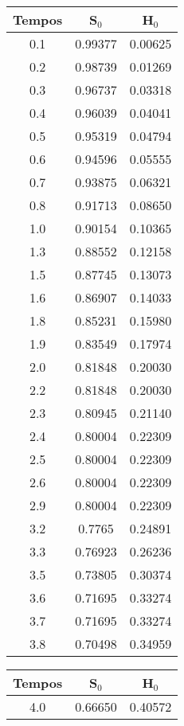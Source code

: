 \documentclass[12pt,a4paper]{article}
\begin{document}
 	\begin{center}
 		\begin{tabular}{|c|c|c|}\hline
 			Tempos & S$_{0}$ & H$_{0}$\\ \hline
 			0.1 & 0.99377 & 0.00625\\ \hline
 			0.2 & 0.98739 & 0.01269\\ \hline
 			0.3 & 0.96737 & 0.03318\\ \hline
 			0.4 & 0.96039 & 0.04041\\ \hline
 			0.5 & 0.95319 & 0.04794\\ \hline
 			0.6 & 0.94596 & 0.05555\\ \hline
 			0.7 & 0.93875 & 0.06321\\ \hline
 			0.8 & 0.91713 & 0.08650\\ \hline
 			1.0 & 0.90154 & 0.10365\\ \hline
 			1.3 & 0.88552 & 0.12158\\ \hline
 			1.5 & 0.87745 & 0.13073\\ \hline
 			1.6 & 0.86907 & 0.14033\\ \hline
 			1.8 & 0.85231 & 0.15980\\ \hline
 			1.9 & 0.83549 & 0.17974\\ \hline
 			2.0 & 0.81848 & 0.20030\\ \hline
 			2.2 & 0.81848 & 0.20030\\ \hline
 			2.3 & 0.80945 & 0.21140\\ \hline
 			2.4 & 0.80004 & 0.22309\\ \hline
 			2.5 & 0.80004 & 0.22309\\ \hline
 			2.6 & 0.80004 & 0.22309\\ \hline
 			2.9 & 0.80004 & 0.22309\\ \hline
 			3.2 & 0.7765 & 0.24891\\ \hline
 			3.3 & 0.76923 & 0.26236\\ \hline
 			3.5 & 0.73805 & 0.30374\\ \hline
 			3.6 & 0.71695 & 0.33274\\ \hline
 			3.7 & 0.71695 & 0.33274\\ \hline
 			3.8 & 0.70498 & 0.34959\\ \hline
 		\end{tabular}
 		\hspace{0.5cm}
 		\begin{tabular}{|c|c|c|}\hline
 			Tempos & S$_{0}$ & H$_{0}$\\ \hline
 			4.0 & 0.66650 & 0.40572\\ \hline

\end{tabular}
\end{center}
\end{document}
